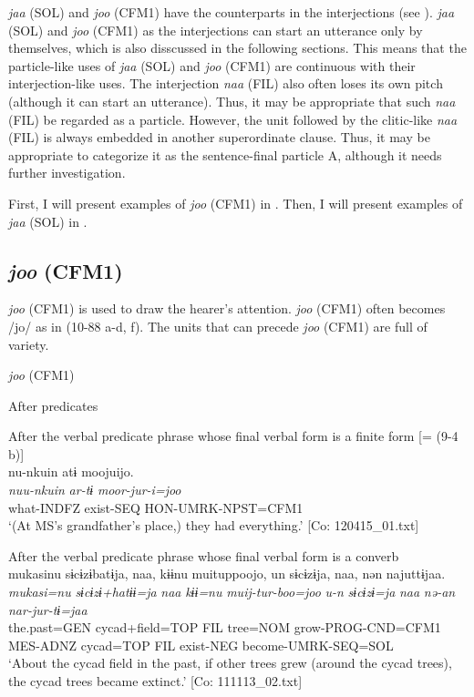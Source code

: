 \begin{xlist}
\textit{jaa}  (SOL) and \textit{joo} (CFM1) have the counterparts in the interjections (see ). \textit{jaa} (SOL) and \textit{joo} (CFM1) as the interjections can start an utterance only by themselves, which is also disscussed in the following sections. This means that the particle-like uses of \textit{jaa} (SOL) and \textit{joo} (CFM1) are continuous with their interjection-like uses. The interjection \textit{naa} (FIL) also often loses its own pitch (although it can start an utterance). Thus, it may be appropriate that such \textit{naa} (FIL) be regarded as a particle. However, the unit followed by the clitic-like \textit{naa} (FIL) is always embedded in another superordinate clause. Thus, it may be appropriate to categorize it as the sentence-final particle A, although it needs further investigation.

First, I will present examples of \textit{joo} (CFM1) in . Then, I will present examples of \textit{jaa} (SOL) in .

\subsection{\textit{joo} (CFM1)}\label{sec:10.5.1}

\textit{joo} (CFM1) is used to draw the hearer’s attention. \textit{joo} (CFM1) often becomes /jo/ as in (10-88 a-d, f). The units that can precede \textit{joo} (CFM1) are full of variety.

\ea\label{ex:10.88}   \textit{joo} (CFM1)\\
    \begin{xlist}
  \exi{} After predicates

  \ex  After the verbal predicate phrase whose final verbal form is a finite form [= (9-4 b)]\\
      \glll    nu-nkuin  atɨ  moojuijo.\\
      \textit{nuu-nkuin}  \textit{ar-tɨ}  \textit{moor-jur-i=joo}\\
      what-INDFZ  exist-SEQ  HON-UMRK-NPST=CFM1\\
      \glt       ‘(At MS’s grandfather’s place,) they had everything.’ [Co: 120415\_01.txt]

  \ex After the verbal predicate phrase whose final verbal form is a converb\\
      \glll    mukasinu  sɨcɨzɨbatɨja,  naa,  kɨɨnu  muituppoojo,  un  sɨcɨzɨja,  naa,  nən  najuttɨjaa.\\
      \textit{mukasi=nu}  \textit{sɨcɨzɨ+hatɨɨ=ja}  \textit{naa}  \textit{kɨɨ=nu}  \textit{muij-tur-boo=joo}     \textit{u-n}  \textit{sɨcɨzɨ=ja}  \textit{naa}  \textit{nə-an}  \textit{nar-jur-tɨ=jaa}\\
      the.past=GEN  cycad+field=TOP  FIL  tree=NOM  grow-PROG-CND=CFM1  MES-ADNZ  cycad=TOP  FIL  exist-NEG  become-UMRK-SEQ=SOL\\
      \glt       ‘About the cycad field in the past, if other trees grew (around the cycad trees), the cycad trees became extinct.’ [Co: 111113\_02.txt]


\end{xlist}
\end{xlist}
